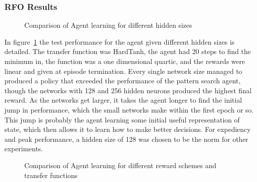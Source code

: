 \subsubsection{RFO Results}
\begin{figure}
\centering

\caption{Comparison of Agent learning for different hidden sizes}
\label{fig:exp1rfo}
\end{figure}
In figure~\ref{fig:exp1rfo} the test performance for the agent given different hidden sizes is detailed. The transfer function was HardTanh, the agent had 20 steps to find the minimum in, the function was a one dimensional quartic, and the rewards were linear and given at episode termination. Every single network size managed to produced a policy that exceeded the performance of the pattern search agent, though the networks with 128 and 256 hidden neurons produced the highest final reward. As the networks get larger, it takes the agent longer to find the initial jump in performance, which the small networks make within the first epoch or so. This jump is probably the agent learning some initial useful representation of state, which then allows it to learn how to make better decisions. For expediency and peak performance, a hidden size of 128 was chosen to be the norm for other experiments.

\begin{figure}
\centering

\caption{Comparison of Agent learning for different reward schemes and transfer functions}
\label{fig:exp3rfo}
\end{figure}

